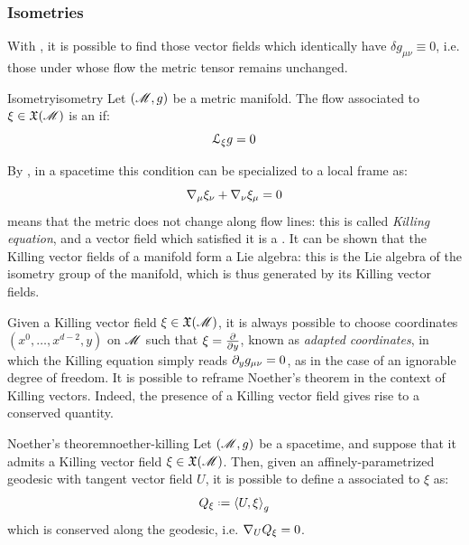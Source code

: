 \subsubsection{Isometries}
\label{ssec:isometries}

With , it is possible to find those vector fields which identically have $ \delta g_{\mu \nu} \equiv 0 $, i.e. those under whose flow the metric tensor remains unchanged.

\begin{definition}{Isometry}{isometry}
  Let $ (\mathscr{M} , g) $ be a metric manifold. The flow associated to $ \xi \in \mathfrak{X}(\mathscr{M}) $ is an  if:
  \begin{equation}
    \EuScript{L}_\xi g = 0
  \end{equation}
\end{definition}

By , in a spacetime this condition can be specialized to a local frame as:
\begin{equation}
  \nabla_\mu \xi_\nu + \nabla_\nu \xi_\mu = 0
  \label{eq:killing}
\end{equation}
 means that the metric does not change along flow lines: this is called \textit{Killing equation}, and a vector field which satisfied it is a .
It can be shown that the Killing vector fields of a manifold form a Lie algebra: this is the Lie algebra of the isometry group of the manifold, which is thus generated by its Killing vector fields.

Given a Killing vector field $ \xi \in \mathfrak{X}(\mathscr{M}) $, it is always possible to choose coordinates $ (x^0 , \dots , x^{d-2} , y) $ on $ \mathscr{M} $ such that $ \xi = \frac{\partial}{\partial y} $, known as \emph{adapted coordinates}, in which the Killing equation simply reads $ \partial_y g_{\mu \nu} = 0 $, as in the case of an ignorable degree of freedom. It is possible to reframe Noether's theorem in the context of Killing vectors. Indeed, the presence of a Killing vector field gives rise to a conserved quantity.

\begin{theorem}{Noether's theorem}{noether-killing}
  Let $ (\mathscr{M},g) $ be a spacetime, and suppose that it admits a Killing vector field $ \xi \in \mathfrak{X}(\mathscr{M}) $. Then, given an affinely-parametrized geodesic with tangent vector field $ U $, it is possible to define a  associated to $ \xi $ as:
  \begin{equation}
    Q_\xi \defeq \braket{U , \xi}_g
  \end{equation}
  which is conserved along the geodesic, i.e. $ \nabla_U Q_\xi = 0 $.
\end{theorem}

